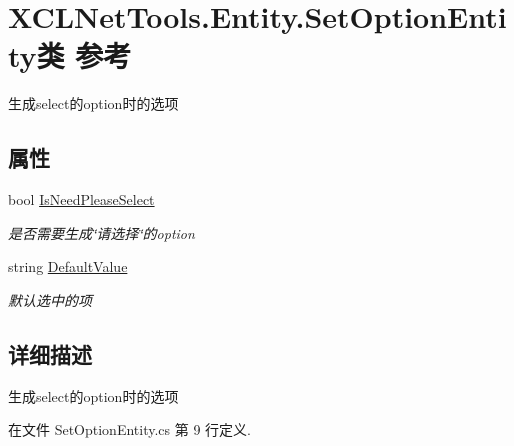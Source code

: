 \hypertarget{class_x_c_l_net_tools_1_1_entity_1_1_set_option_entity}{\section{X\-C\-L\-Net\-Tools.\-Entity.\-Set\-Option\-Entity类 参考}
\label{class_x_c_l_net_tools_1_1_entity_1_1_set_option_entity}
}


生成select的option时的选项  


\subsection*{属性}
\begin{DoxyCompactItemize}
\item 
bool \hyperlink{class_x_c_l_net_tools_1_1_entity_1_1_set_option_entity_a22c7d14f09183bb9124fa9219663be6c}{Is\-Need\-Please\-Select}
\begin{DoxyCompactList}\small\item\em 是否需要生成\char`\"{}请选择\char`\"{}的option \end{DoxyCompactList}\item 
string \hyperlink{class_x_c_l_net_tools_1_1_entity_1_1_set_option_entity_a504fe6ad96f52cb7eb9f8a4e64e07723}{Default\-Value}
\begin{DoxyCompactList}\small\item\em 默认选中的项 \end{DoxyCompactList}\end{DoxyCompactItemize}


\subsection{详细描述}
生成select的option时的选项 



在文件 Set\-Option\-Entity.\-cs 第 9 行定义.



